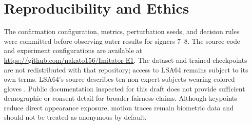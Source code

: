 \section*{Reproducibility and Ethics}

The confirmation configuration, metrics, perturbation seeds, and decision rules
were committed before observing \ImitatorEOne{} outer results for signers 7--8.
The source code and experiment configurations are available at
\url{https://github.com/nakato156/Imitator-E1}. The dataset and trained
checkpoints are not redistributed with that repository; access to LSA64 remains
subject to its own terms. LSA64's source describes ten non-expert subjects wearing
colored gloves \citep{ronchetti2016lsa64}. Public documentation inspected for this
draft does not provide sufficient demographic or consent detail for broader fairness
claims. Although keypoints reduce direct appearance exposure, motion traces remain
biometric data and should not be treated as anonymous by default.
